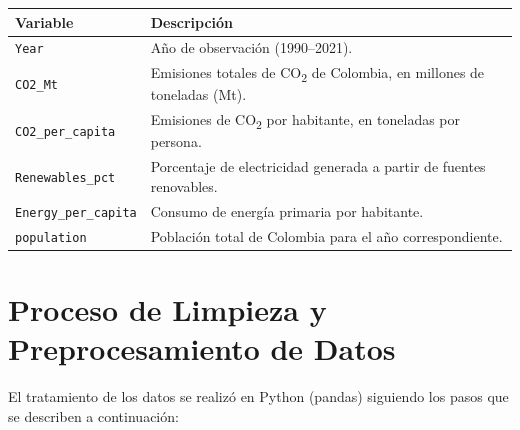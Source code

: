 \documentclass[11pt]{article}
\begin{document}
\begin{center}
\begin{tabular}{@{}p{3.3cm}p{9.5cm}@{}}
\toprule
\textbf{Variable} & \textbf{Descripción} \\
\midrule
\texttt{Year} & Año de observación (1990--2021). \\
\texttt{CO2\_Mt} & Emisiones totales de CO\textsubscript{2} de Colombia, en millones de toneladas (Mt). \\
\texttt{CO2\_per\_capita} & Emisiones de CO\textsubscript{2} por habitante, en toneladas por persona. \\
\texttt{Renewables\_pct} & Porcentaje de electricidad generada a partir de fuentes renovables. \\
\texttt{Energy\_per\_capita} & Consumo de energía primaria por habitante. \\
\texttt{population} & Población total de Colombia para el año correspondiente. \\
\bottomrule
\end{tabular}
\end{center}

\section{Proceso de Limpieza y Preprocesamiento de Datos}

El tratamiento de los datos se realizó en Python (pandas) siguiendo los pasos que se describen a continuación:
\end{document}
